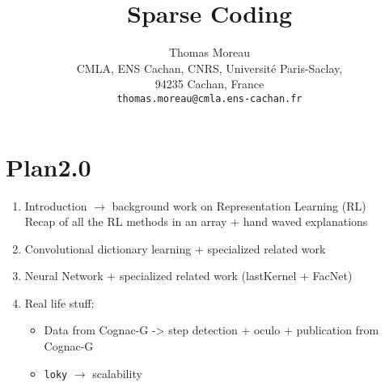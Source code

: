 \documentclass{article}
\title{Sparse Coding}
\author{
	Thomas Moreau\\
	CMLA, ENS Cachan, CNRS, Universit\'e Paris-Saclay,\\
	94235 Cachan, France\\
	\texttt{thomas.moreau@cmla.ens-cachan.fr}
}
\begin{document}
\def\biblio{}

\maketitle



\section{Plan2.0}

\begin{enumerate}
	\item Introduction $\rightarrow$  background work on Representation Learning (RL)\\
	Recap of all the RL methods in an array + hand waved explanations
	\item Convolutional dictionary learning + specialized related work
	\item Neural Network + specialized related work (lastKernel + FacNet)
	\item Real life stuff:
	\begin{itemize}
	\item Data from Cognac-G -> step detection + oculo + publication from Cognac-G
	\item {\tt loky} $\rightarrow$ scalability
\end{itemize}
\end{enumerate}













\end{document}
